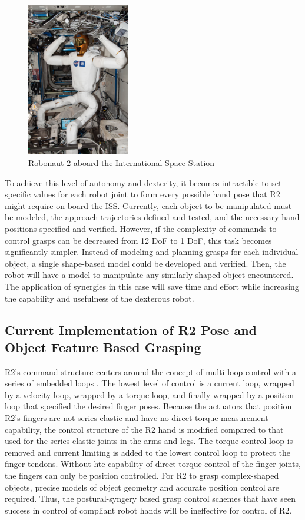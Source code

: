 \documentclass[runningheads,a4paper]{llncs}
\begin{document}
   \begin{figure}[t]
      \centering
      \includegraphics[width=0.4\textwidth]{r2_iss}
      \caption{Robonaut 2 aboard the International Space Station}
      \label{at_r2_iss}
   \end{figure}

To achieve this level of autonomy and dexterity, it becomes intractible to set specific values for each robot joint to form every possible hand pose that R2 might require on board the ISS. Currently, each object to be manipulated must be modeled, the approach trajectories defined and tested, and the necessary hand positions specified and verified. However, if the complexity of commands to control grasps can be decreased from 12 DoF to 1 DoF, this task becomes significantly simpler. Instead of modeling and planning grasps for each individual object, a single shape-based model could be developed and verified. Then, the robot will have a model to manipulate any similarly shaped object encountered. The application of synergies in this case will save time and effort while increasing the capability and usefulness of the dexterous robot.   


\subsection{Current Implementation of R2 Pose and Object Feature Based Grasping}
R2's command structure centers around the concept of multi-loop control with a series of embedded loops \cite{r2_control}. The lowest level of control is a current loop, wrapped by a velocity loop, wrapped by a torque loop, and finally wrapped by a position loop that specified the desired finger poses. 
Because the actuators that position R2's fingers are not series-elastic and have no direct torque measurement capability, the control structure of the R2 hand is modified compared to that used for the series elastic joints in the arms and legs. The torque control loop is removed and current limiting is added to the lowest control loop to protect the finger tendons. Without hte capability of direct torque control of the finger joints, the fingers can only be position controlled. For R2 to grasp complex-shaped objects, precise models of object geometry and accurate position control are required. Thus, the postural-syngery based grasp control schemes that have seen success in control of compliant robot hands \cite{} will be ineffective for control of R2. 
\end{document}
